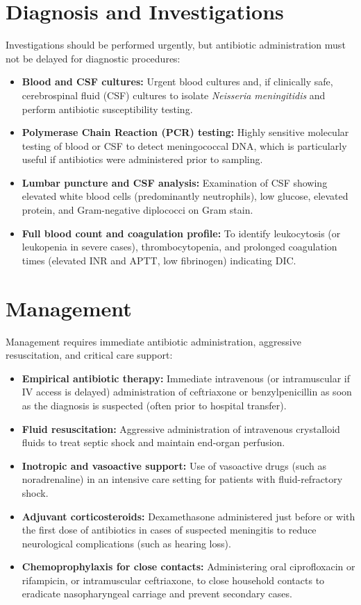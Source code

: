 \section*{Diagnosis and Investigations}
Investigations should be performed urgently, but antibiotic administration must not be delayed for diagnostic procedures:
\begin{itemize}
    \item \textbf{Blood and CSF cultures:} Urgent blood cultures and, if clinically safe, cerebrospinal fluid (CSF) cultures to isolate \textit{Neisseria meningitidis} and perform antibiotic susceptibility testing.
    \item \textbf{Polymerase Chain Reaction (PCR) testing:} Highly sensitive molecular testing of blood or CSF to detect meningococcal DNA, which is particularly useful if antibiotics were administered prior to sampling.
    \item \textbf{Lumbar puncture and CSF analysis:} Examination of CSF showing elevated white blood cells (predominantly neutrophils), low glucose, elevated protein, and Gram-negative diplococci on Gram stain.
    \item \textbf{Full blood count and coagulation profile:} To identify leukocytosis (or leukopenia in severe cases), thrombocytopenia, and prolonged coagulation times (elevated INR and APTT, low fibrinogen) indicating DIC.
\end{itemize}

\section*{Management}
Management requires immediate antibiotic administration, aggressive resuscitation, and critical care support:
\begin{itemize}
    \item \textbf{Empirical antibiotic therapy:} Immediate intravenous (or intramuscular if IV access is delayed) administration of ceftriaxone or benzylpenicillin as soon as the diagnosis is suspected (often prior to hospital transfer).
    \item \textbf{Fluid resuscitation:} Aggressive administration of intravenous crystalloid fluids to treat septic shock and maintain end-organ perfusion.
    \item \textbf{Inotropic and vasoactive support:} Use of vasoactive drugs (such as noradrenaline) in an intensive care setting for patients with fluid-refractory shock.
    \item \textbf{Adjuvant corticosteroids:} Dexamethasone administered just before or with the first dose of antibiotics in cases of suspected meningitis to reduce neurological complications (such as hearing loss).
    \item \textbf{Chemoprophylaxis for close contacts:} Administering oral ciprofloxacin or rifampicin, or intramuscular ceftriaxone, to close household contacts to eradicate nasopharyngeal carriage and prevent secondary cases.
\end{itemize}

